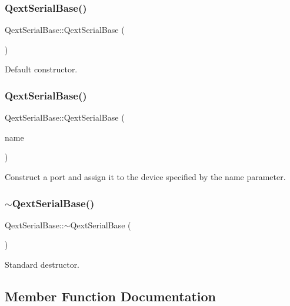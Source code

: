 \subsubsection{\texorpdfstring{Qext\+Serial\+Base()}{QextSerialBase()}\hspace{0.1cm}{\footnotesize\ttfamily [1/2]}}
{\footnotesize\ttfamily Qext\+Serial\+Base\+::\+Qext\+Serial\+Base (\begin{DoxyParamCaption}{ }\end{DoxyParamCaption})}

Default constructor. \mbox{\label{class_qext_serial_base_a136b187c6684be0bac22e616b053f7b7}} 
\subsubsection{\texorpdfstring{Qext\+Serial\+Base()}{QextSerialBase()}\hspace{0.1cm}{\footnotesize\ttfamily [2/2]}}
{\footnotesize\ttfamily Qext\+Serial\+Base\+::\+Qext\+Serial\+Base (\begin{DoxyParamCaption}\item[{const Q\+String \&}]{name }\end{DoxyParamCaption})}

Construct a port and assign it to the device specified by the name parameter. \mbox{\label{class_qext_serial_base_a80eeebbf4585220ec3ced8fcebf6279f}} 
\subsubsection{\texorpdfstring{$\sim$\+Qext\+Serial\+Base()}{~QextSerialBase()}}
{\footnotesize\ttfamily Qext\+Serial\+Base\+::$\sim$\+Qext\+Serial\+Base (\begin{DoxyParamCaption}{ }\end{DoxyParamCaption})\hspace{0.3cm}{\ttfamily [virtual]}}

Standard destructor. 

\subsection{Member Function Documentation}
\mbox{\label{class_qext_serial_base_a06cb503e03af3a372abc715ac7fbb63c}} 
